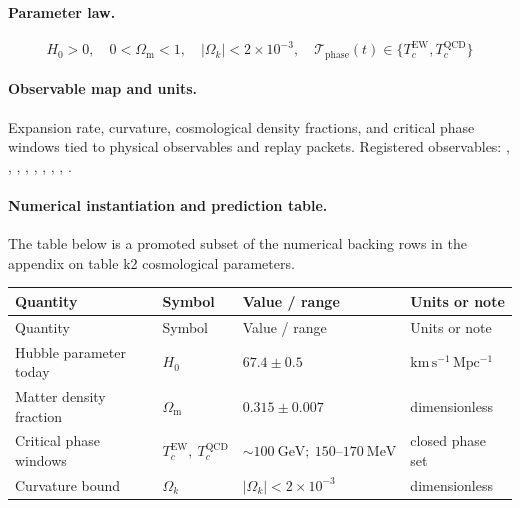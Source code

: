 \paragraph{Parameter law.}
\[
H_0 > 0,\quad 0 < \Omega_{\mathrm{m}} < 1,\quad |\Omega_k| < 2 \times 10^{-3},\quad \mathcal{T}_{\mathrm{phase}}(t) \in \{T_c^{\mathrm{EW}}, T_c^{\mathrm{QCD}}\}
\]

\paragraph{Observable map and units.}
Expansion rate, curvature, cosmological density fractions, and critical phase windows tied to physical observables and replay packets.
Registered observables: , \allowbreak {}, \allowbreak {}, \allowbreak {}, \allowbreak {}, \allowbreak {}, \allowbreak {}, \allowbreak {}, \allowbreak {}.

\paragraph{Numerical instantiation and prediction table.}
The table below is a promoted subset of the numerical backing rows in the appendix on table k2 cosmological parameters.
\begin{longtable}{@{}L{0.27\textwidth}L{0.15\textwidth}L{0.24\textwidth}L{0.16\textwidth}@{}}
\toprule
Quantity & Symbol & Value / range & Units or note \\
\midrule
\endfirsthead
\toprule
Quantity & Symbol & Value / range & Units or note \\
\midrule
\endhead
Hubble parameter today & $\scriptstyle H_0$ & $67.4 \pm 0.5$ & $\mathrm{km\,s^{-1}\,Mpc^{-1}}$ \\
Matter density fraction & $\scriptstyle \Omega_{\mathrm{m}}$ & $0.315 \pm 0.007$ & dimensionless \\
Critical phase windows & $\scriptstyle T_c^{\mathrm{EW}},\allowbreak \ T_c^{\mathrm{QCD}}$ & $\sim 100\ \mathrm{GeV};\allowbreak \ 150\text{--}170\ \mathrm{MeV}$ & closed phase set \\
Curvature bound & $\scriptstyle \Omega_k$ & $|\Omega_k| < 2 \times 10^{-3}$ & dimensionless \\
\bottomrule
\end{longtable}

